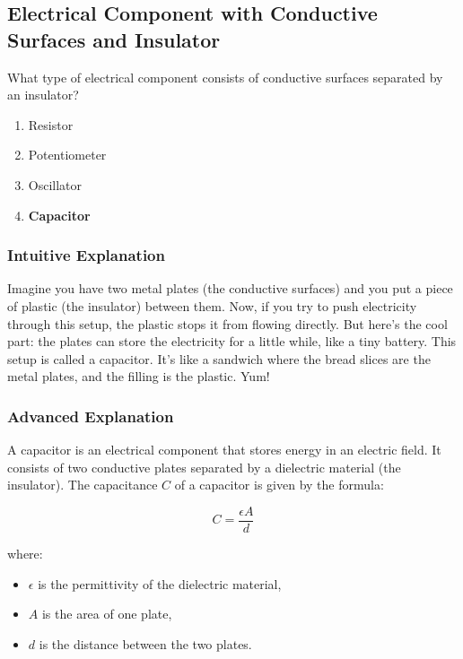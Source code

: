 \subsection{Electrical Component with Conductive Surfaces and Insulator}
\label{T6A05}

\begin{tcolorbox}[colback=gray!10!white,colframe=black!75!black,title=T6A05]
What type of electrical component consists of conductive surfaces separated by an insulator?
\begin{enumerate}[label=\Alph*)]
    \item Resistor
    \item Potentiometer
    \item Oscillator
    \item \textbf{Capacitor}
\end{enumerate}
\end{tcolorbox}

\subsubsection{Intuitive Explanation}
Imagine you have two metal plates (the conductive surfaces) and you put a piece of plastic (the insulator) between them. Now, if you try to push electricity through this setup, the plastic stops it from flowing directly. But here's the cool part: the plates can store the electricity for a little while, like a tiny battery. This setup is called a capacitor. It’s like a sandwich where the bread slices are the metal plates, and the filling is the plastic. Yum!

\subsubsection{Advanced Explanation}
A capacitor is an electrical component that stores energy in an electric field. It consists of two conductive plates separated by a dielectric material (the insulator). The capacitance \( C \) of a capacitor is given by the formula:

\[
C = \frac{\epsilon A}{d}
\]

where:
\begin{itemize}
    \item \( \epsilon \) is the permittivity of the dielectric material,
    \item \( A \) is the area of one plate,
    \item \( d \) is the distance between the two plates.
\end{itemize}

